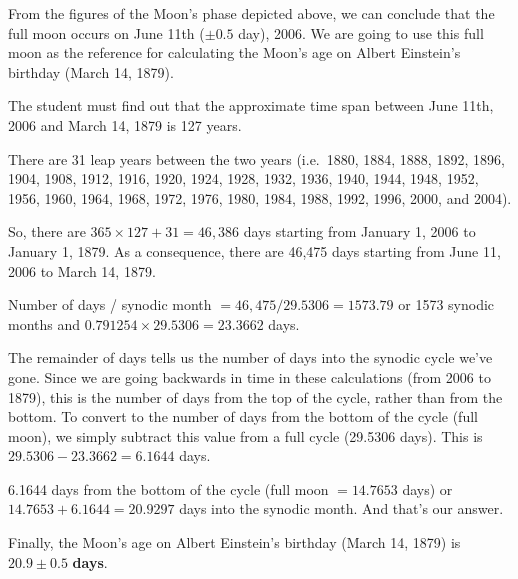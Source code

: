 From the figures of the Moon's phase depicted above, we can conclude that the
full moon occurs on June 11th ($\pm 0.5$ day), 2006. We are going to use this
full moon as the reference for calculating the Moon's age on Albert Einstein's
birthday (March 14, 1879).

The student must find out that the approximate time span between June 11th,
2006 and March 14, 1879 is 127 years.

There are 31 leap years between the two years (i.e.\ 1880, 1884, 1888, 1892,
1896, 1904, 1908, 1912, 1916, 1920, 1924, 1928, 1932, 1936, 1940, 1944, 1948,
1952, 1956, 1960, 1964, 1968, 1972, 1976, 1980, 1984, 1988, 1992, 1996, 2000,
and 2004).

So, there are $365 \times 127 + 31 = 46{,}386$ days starting from January 1,
2006 to January 1, 1879. As a consequence, there are 46,475 days starting from
June 11, 2006 to March 14, 1879.

Number of days / synodic month $= 46{,}475/29.5306 = 1573.79$
or 1573 synodic months and $0.791254 \times 29.5306 = 23.3662$ days.

The remainder of days tells us the number of days into the synodic cycle we've
gone. Since we are going backwards in time in these calculations (from 2006 to
1879), this is the number of days from the top of the cycle, rather than from
the bottom. To convert to the number of days from the bottom of the cycle
(full moon), we simply subtract this value from a full cycle (29.5306 days).
This is $29.5306 - 23.3662 = 6.1644$ days.

6.1644 days from the bottom of the cycle (full moon $= 14.7653$ days) or
$14.7653 + 6.1644 = 20.9297$ days into the synodic month. And that's our
answer.

Finally, the Moon's age on Albert Einstein's birthday (March 14, 1879) is
$\mathbf{20.9 \pm 0.5}$ \textbf{days}.

